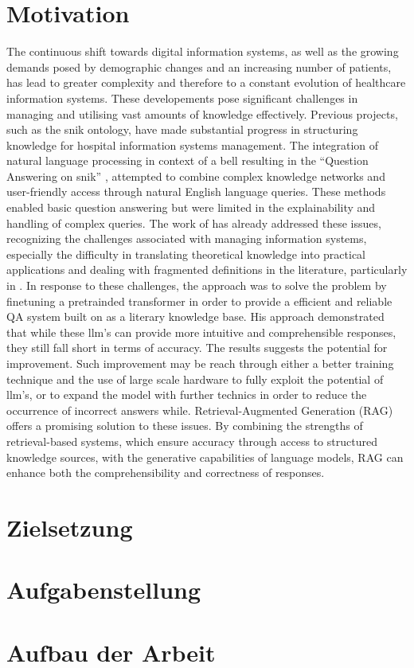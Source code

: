 \section{Motivation}
The continuous shift towards digital information systems, as well as the growing demands posed by demographic changes and an increasing number of patients, has lead to greater complexity and therefore to a constant evolution of healthcare information systems. 
These developements pose significant challenges in managing and utilising vast amounts of knowledge effectively. 
Previous projects, such as the \ac{snik} ontology, have made substantial progress in structuring knowledge for hospital information systems management. 
The integration of natural language processing in context of a \ac{bell} resulting in the \enquote{Question Answering on \ac{snik}} \citep{hannesbell, hannesbell_skill}, attempted to combine complex knowledge networks and user-friendly access through natural English language queries. 
These methods enabled basic question answering but were limited in the explainability and handling of complex queries.
The work of \citet{Paul_Keller} has already addressed these issues, recognizing the challenges associated with managing information systems, especially the difficulty in translating theoretical knowledge into practical applications and dealing with fragmented definitions in the literature, particularly in \citet{bb2}. 
In response to these challenges, the approach was to solve the problem by finetuning a pretrainded transformer in order to provide a efficient and reliable QA system built on \citet{bb2} as a literary knowledge base.
His approach demonstrated that while these \ac{llm}'s can provide more intuitive and comprehensible responses, they still fall short in terms of accuracy. 
The results suggests the potential for improvement. 
Such improvement may be reach through either a better training technique and the use of large scale hardware to fully exploit the potential of \ac{llm}'s, or to expand the model with further technics in order to reduce the occurrence of incorrect answers while.
Retrieval-Augmented Generation (RAG) offers a promising solution to these issues. 
By combining the strengths of retrieval-based systems, which ensure accuracy through access to structured knowledge sources, with the generative capabilities of language models, RAG can enhance both the comprehensibility and correctness of responses. 
%
\section{Zielsetzung}\label{sec:zielsetzung}


\section{Aufgabenstellung}



\section{Aufbau der Arbeit}
